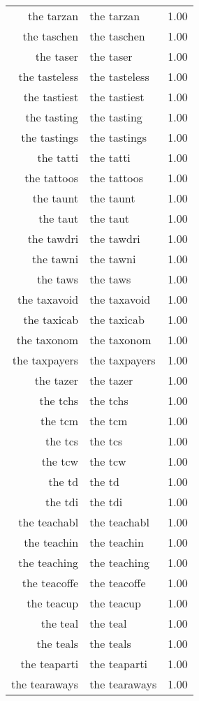 \begin{table}[ht]
\begin{tabular}{rlr}
  the tarzan & the tarzan & 1.00 \\ 
  the taschen & the taschen & 1.00 \\ 
  the taser & the taser & 1.00 \\ 
  the tasteless & the tasteless & 1.00 \\ 
  the tastiest & the tastiest & 1.00 \\ 
  the tasting & the tasting & 1.00 \\ 
  the tastings & the tastings & 1.00 \\ 
  the tatti & the tatti & 1.00 \\ 
  the tattoos & the tattoos & 1.00 \\ 
  the taunt & the taunt & 1.00 \\ 
  the taut & the taut & 1.00 \\ 
  the tawdri & the tawdri & 1.00 \\ 
  the tawni & the tawni & 1.00 \\ 
  the taws & the taws & 1.00 \\ 
  the taxavoid & the taxavoid & 1.00 \\ 
  the taxicab & the taxicab & 1.00 \\ 
  the taxonom & the taxonom & 1.00 \\ 
  the taxpayers & the taxpayers & 1.00 \\ 
  the tazer & the tazer & 1.00 \\ 
  the tchs & the tchs & 1.00 \\ 
  the tcm & the tcm & 1.00 \\ 
  the tcs & the tcs & 1.00 \\ 
  the tcw & the tcw & 1.00 \\ 
  the td & the td & 1.00 \\ 
  the tdi & the tdi & 1.00 \\ 
  the teachabl & the teachabl & 1.00 \\ 
  the teachin & the teachin & 1.00 \\ 
  the teaching & the teaching & 1.00 \\ 
  the teacoffe & the teacoffe & 1.00 \\ 
  the teacup & the teacup & 1.00 \\ 
  the teal & the teal & 1.00 \\ 
  the teals & the teals & 1.00 \\ 
  the teaparti & the teaparti & 1.00 \\ 
  the tearaways & the tearaways & 1.00 \\ 

\end{tabular}
\end{table}
